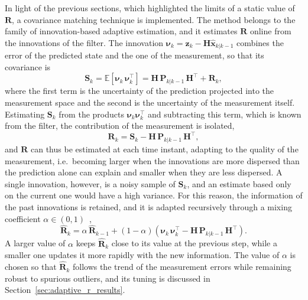 In light of the previous sections, which highlighted the limits of a static value of
$\mathbf{R}$, a covariance matching technique is implemented. The method belongs to the family of innovation-based adaptive estimation, and it estimates
$\mathbf{R}$ online from the innovations of the filter. The innovation
$\boldsymbol{\nu}_k = \mathbf{z}_k - \mathbf{H}\hat{\mathbf{x}}_{k|k-1}$ combines the error of
the predicted state and the one of the measurement, so that its covariance is
\begin{equation}
    \mathbf{S}_k = \mathbb{E}\left[\boldsymbol{\nu}_k\,\boldsymbol{\nu}_k^\top\right]
    = \mathbf{H}\,\mathbf{P}_{k|k-1}\,\mathbf{H}^\top + \mathbf{R}_k,
    \label{eq:cm_innov_cov}
\end{equation}
where the first term is the uncertainty of the prediction projected into the measurement
space and the second is the uncertainty of the measurement itself. Estimating $\mathbf{S}_k$ from the products $\boldsymbol{\nu}_k\boldsymbol{\nu}_k^\top$
and subtracting this term, which is known from the filter, the contribution of the
measurement is isolated,
\begin{equation}
    \mathbf{R}_k = \mathbf{S}_k - \mathbf{H}\,\mathbf{P}_{k|k-1}\,\mathbf{H}^\top,
    \label{eq:cm_R}
\end{equation}
and $\mathbf{R}$ can thus be estimated at each time instant, adapting to the quality of the
measurement, i.e.\ becoming larger when the innovations are more dispersed than the
prediction alone can explain and smaller when they are less dispersed. 
A single innovation, however, is a noisy sample of $\mathbf{S}_k$, and an estimate based only
on the current one would have a high variance. For this reason, the information of the past
innovations is retained, and it is adapted recursively through a mixing coefficient $\alpha \in (0,1)$~\cite{akhlaghi2017},
\begin{equation}
    \hat{\mathbf{R}}_k = \alpha\,\hat{\mathbf{R}}_{k-1}
    + (1-\alpha)\left(\boldsymbol{\nu}_k\,\boldsymbol{\nu}_k^\top
    - \mathbf{H}\,\mathbf{P}_{k|k-1}\,\mathbf{H}^\top\right).
    \label{eq:cm_R_alpha}
\end{equation}
A larger value of $\alpha$ keeps $\hat{\mathbf{R}}_k$ close to its value at the previous
step, while a smaller one updates it more rapidly with the new information. The value of
$\alpha$ is chosen so that $\hat{\mathbf{R}}_k$ follows the trend of the measurement errors while
remaining robust to spurious outliers, and its tuning is discussed in
Section~\ref{sec:adaptive_r_results}.

